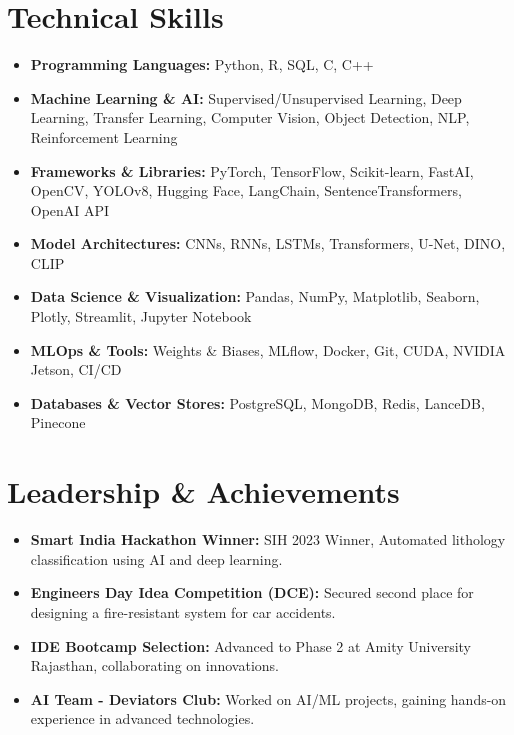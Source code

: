 \documentclass[letterpaper,11pt]{article}
\newcommand{\resumeItem}[1]{
  \item\small{
    {#1 \vspace{-2pt}}
  }
}
\newcommand{\resumeSubHeadingListStart}{\begin{itemize}[leftmargin=0.0in, label={}]}
\newcommand{\resumeSubHeadingListEnd}{\end{itemize}}
\begin{document}
\section{Technical Skills}
\resumeSubHeadingListStart
  \resumeItem{\textbf{Programming Languages:} Python, R, SQL, C, C++}
  \resumeItem{\textbf{Machine Learning \& AI:} Supervised/Unsupervised Learning, Deep Learning, Transfer Learning, Computer Vision, Object Detection, NLP, Reinforcement Learning}
  \resumeItem{\textbf{Frameworks \& Libraries:} PyTorch, TensorFlow, Scikit-learn, FastAI, OpenCV, YOLOv8, Hugging Face, LangChain, SentenceTransformers, OpenAI API}
  \resumeItem{\textbf{Model Architectures:} CNNs, RNNs, LSTMs, Transformers, U-Net, DINO, CLIP}
  \resumeItem{\textbf{Data Science \& Visualization:} Pandas, NumPy, Matplotlib, Seaborn, Plotly, Streamlit, Jupyter Notebook}
  \resumeItem{\textbf{MLOps \& Tools:} Weights \& Biases, MLflow, Docker, Git, CUDA, NVIDIA Jetson, CI/CD}
  \resumeItem{\textbf{Databases \& Vector Stores:} PostgreSQL, MongoDB, Redis, LanceDB, Pinecone}
\resumeSubHeadingListEnd



\section{Leadership \& Achievements}
\resumeSubHeadingListStart
  \resumeItem{\textbf{Smart India Hackathon Winner:} SIH 2023 Winner, Automated lithology classification using AI and deep learning.}
  \resumeItem{\textbf{Engineers Day Idea Competition (DCE):} Secured second place for designing a fire-resistant system for car accidents.}
  \resumeItem{\textbf{IDE Bootcamp Selection:} Advanced to Phase 2 at Amity University Rajasthan, collaborating on innovations.}
  \resumeItem{\textbf{AI Team - Deviators Club:} Worked on AI/ML projects, gaining hands-on experience in advanced technologies.}
\resumeSubHeadingListEnd
\end{document}
